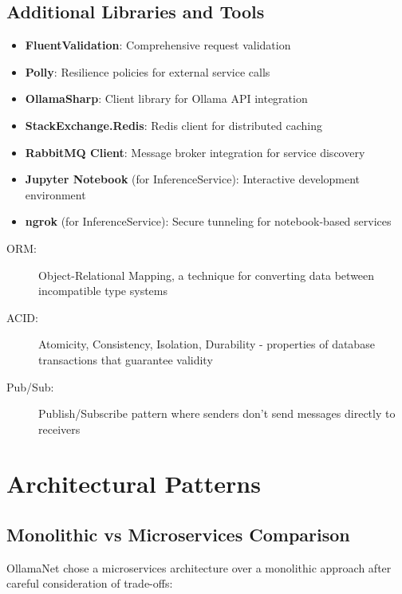 \subsection*{Additional Libraries and Tools}
\begin{itemize}
    \item \textbf{FluentValidation}: Comprehensive request validation
    \item \textbf{Polly}: Resilience policies for external service calls
    \item \textbf{OllamaSharp}: Client library for Ollama API integration
    \item \textbf{StackExchange.Redis}: Redis client for distributed caching
    \item \textbf{RabbitMQ Client}: Message broker integration for service discovery
    \item \textbf{Jupyter Notebook} (for InferenceService): Interactive development environment
    \item \textbf{ngrok} (for InferenceService): Secure tunneling for notebook-based services
\end{itemize}

\begin{terminology}
\begin{description}
    \item[ORM:] Object-Relational Mapping, a technique for converting data between incompatible type systems
    \item[ACID:] Atomicity, Consistency, Isolation, Durability - properties of database transactions that guarantee validity
    \item[Pub/Sub:] Publish/Subscribe pattern where senders don't send messages directly to receivers
\end{description}
\end{terminology}

\section{Architectural Patterns}

\subsection{Monolithic vs Microservices Comparison}

OllamaNet chose a microservices architecture over a monolithic approach after careful consideration of trade-offs:

